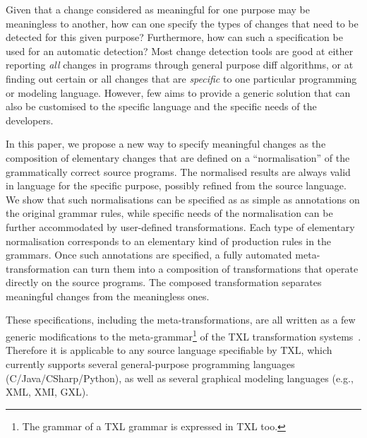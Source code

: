 \documentclass[10pt, conference, compsocconf]{IEEEtran}
\begin{document}
Given that a change considered as meaningful for one purpose may be meaningless to another, how can one specify the types of changes that need to be detected for this given purpose? Furthermore, how can such a specification be used for an automatic detection? Most change detection tools are good at either reporting {\em all} changes in programs through general purpose diff algorithms, or at finding out certain or all changes that are {\em specific} to one particular programming or modeling language. However, few aims to provide a generic solution that can also be customised to the specific language and the specific needs of the developers.


In this paper, we propose a new way to specify meaningful changes as the composition of elementary changes that are defined on a ``normalisation'' of the grammatically correct source programs. The normalised results are always valid in language for the specific purpose, possibly refined from the source language. We show that such normalisations can be specified as as simple as annotations on the original grammar rules, while specific needs of the normalisation can be further accommodated by user-defined transformations. Each type of elementary normalisation corresponds to an elementary kind of production rules in the grammars. Once such annotations are specified, a fully automated meta-transformation can turn them into a composition of transformations that operate directly on the source programs. The composed transformation separates meaningful changes from the meaningless ones.
%

These specifications, including the meta-transformations, are all written as a few generic modifications to the meta-grammar\footnote{The grammar of a TXL grammar is expressed in TXL too.} of the TXL transformation systems~\cite{txl}. Therefore it is applicable to any source language specifiable by TXL, which currently supports several general-purpose programming languages (C/Java/CSharp/Python), as well as several graphical modeling languages (e.g., XML, XMI, GXL). 
\end{document}

